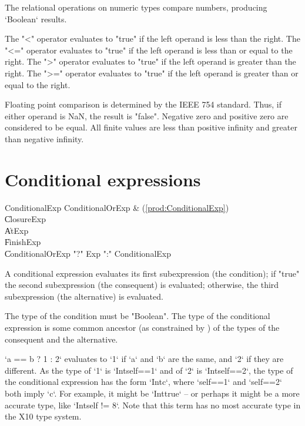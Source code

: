 The relational operations on numeric types compare numbers, producing
\xcd`Boolean` results.

The \xcd"<" operator evaluates to \xcd"true" if the left operand is
less than the right.
The \xcd"<=" operator evaluates to \xcd"true" if the left operand is
less than or equal to the right.
The \xcd">" operator evaluates to \xcd"true" if the left operand is
greater than the right.
The \xcd">=" operator evaluates to \xcd"true" if the left operand is
greater than or equal to the right.

Floating point comparison is determined by the IEEE 754
standard.  Thus,
if either operand is NaN, the result is \xcd"false".
Negative zero and positive zero are considered to be equal.
All finite values are less than positive infinity and greater
than negative infinity.



\section{Conditional expressions}
\label{Conditional}

\begin{bbgrammar}
      ConditionalExp \: ConditionalOrExp & (\ref{prod:ConditionalExp}) \\
                     \| ClosureExp \\
                     \| AtExp \\
                     \| FinishExp \\
                     \| ConditionalOrExp \xcd"?" Exp \xcd":" ConditionalExp \\
\end{bbgrammar}

A conditional expression evaluates its first subexpression (the
condition); if \xcd"true"
the second subexpression (the consequent) is evaluated; otherwise,
the third subexpression (the alternative) is evaluated.

The type of the condition must be \xcd"Boolean".
The type of the conditional expression is some common 
ancestor (as constrained by ) of the types of the consequent and the
alternative. 

\begin{ex}
\xcd`a == b ? 1 : 2`
evaluates to \xcd`1` if \xcd`a` and \xcd`b` are the same, and \xcd`2` if they
are different.   As the type of \xcd`1` is \xcd`Int{self==1}` and of \xcd`2`
is \xcd`Int{self==2}`, the type of the conditional expression has the form
\xcd`Int{c}`, where \xcd`self==1` and \xcd`self==2` both imply \xcd`c`.  For
example, it might be \xcd`Int{true}` -- or perhaps it might be a more accurate
type, like \xcd`Int{self != 8}`. Note that this term has no most accurate type
in the X10 type system.
\end{ex}

